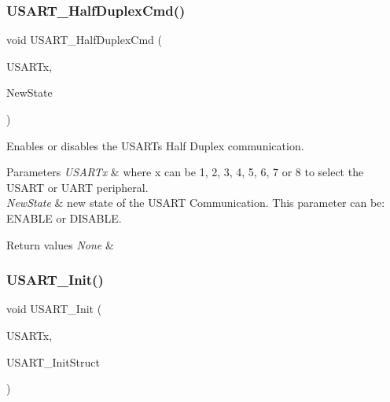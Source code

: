 \subsubsection{\texorpdfstring{U\+S\+A\+R\+T\+\_\+\+Half\+Duplex\+Cmd()}{USART\_HalfDuplexCmd()}}
{\footnotesize\ttfamily void U\+S\+A\+R\+T\+\_\+\+Half\+Duplex\+Cmd (\begin{DoxyParamCaption}\item[{U\+S\+A\+R\+T\+\_\+\+Type\+Def $\ast$}]{U\+S\+A\+R\+Tx,  }\item[{Functional\+State}]{New\+State }\end{DoxyParamCaption})}



Enables or disables the U\+S\+A\+RT\textquotesingle{}s Half Duplex communication. 


\begin{DoxyParams}{Parameters}
{\em U\+S\+A\+R\+Tx} & where x can be 1, 2, 3, 4, 5, 6, 7 or 8 to select the U\+S\+A\+RT or U\+A\+RT peripheral. \\
\hline
{\em New\+State} & new state of the U\+S\+A\+RT Communication. This parameter can be\+: E\+N\+A\+B\+LE or D\+I\+S\+A\+B\+LE. \\
\hline
\end{DoxyParams}

\begin{DoxyRetVals}{Return values}
{\em None} & \\
\hline
\end{DoxyRetVals}
\mbox{\label{group___u_s_a_r_t_ga98da340ea0324002ba1b4263e91ab2ff}} 
\subsubsection{\texorpdfstring{U\+S\+A\+R\+T\+\_\+\+Init()}{USART\_Init()}}
{\footnotesize\ttfamily void U\+S\+A\+R\+T\+\_\+\+Init (\begin{DoxyParamCaption}\item[{U\+S\+A\+R\+T\+\_\+\+Type\+Def $\ast$}]{U\+S\+A\+R\+Tx,  }\item[{\mbox{\hyperlink{struct_u_s_a_r_t___init_type_def}{U\+S\+A\+R\+T\+\_\+\+Init\+Type\+Def}} $\ast$}]{U\+S\+A\+R\+T\+\_\+\+Init\+Struct }\end{DoxyParamCaption})}



